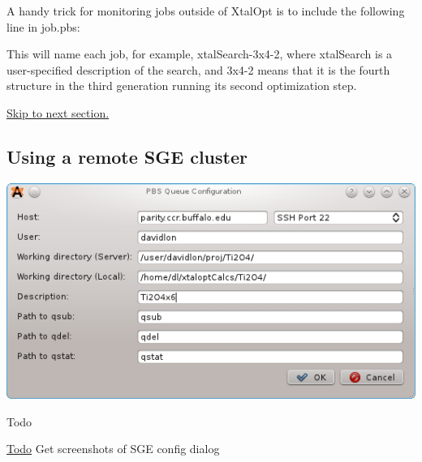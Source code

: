 A handy trick for monitoring jobs outside of Xtal\+Opt is to include the following line in job.\+pbs\+:




This will name each job, for example, xtal\+Search-\/3x4-\/2, where xtal\+Search is a user-\/specified description of the search, and 3x4-\/2 means that it is the fourth structure in the third generation running its second optimization step.

\hyperlink{tut-xo_files}{Skip to next section.}\hypertarget{tut-xo_remotesge}{}\subsection{Using a remote S\+G\+E cluster}\label{tut-xo_remotesge}
 
\begin{DoxyImageNoCaption}
  \mbox{\includegraphics[width=\textwidth]{opt-set-pbs.png}}
\end{DoxyImageNoCaption}
 \begin{DoxyRefDesc}{Todo}
\item[\hyperlink{todo__todo000001}{Todo}]Get screenshots of S\+G\+E config dialog\end{DoxyRefDesc}


